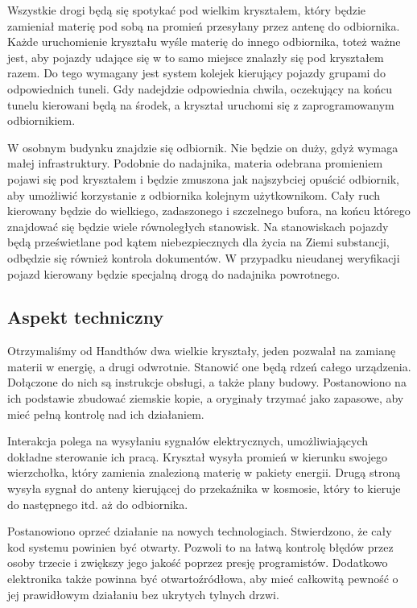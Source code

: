 Wszystkie drogi będą się spotykać pod wielkim kryształem, który będzie zamieniał materię pod sobą na promień przesyłany przez antenę do odbiornika.
Każde uruchomienie kryształu wyśle materię do innego odbiornika, toteż ważne jest, aby pojazdy udające się w to samo miejsce znalazły się pod kryształem razem.
Do tego wymagany jest system kolejek kierujący pojazdy grupami do odpowiednich tuneli.
Gdy nadejdzie odpowiednia chwila, oczekujący na końcu tunelu kierowani będą na środek, a kryształ uruchomi się z zaprogramowanym odbiornikiem.

W osobnym budynku znajdzie się odbiornik.
Nie będzie on duży, gdyż wymaga małej infrastruktury.
Podobnie do nadajnika, materia odebrana promieniem pojawi się pod kryształem i będzie zmuszona jak najszybciej opuścić odbiornik, aby umożliwić korzystanie z odbiornika kolejnym użytkownikom.
Cały ruch kierowany będzie do wielkiego, zadaszonego i szczelnego bufora, na końcu którego znajdować się będzie wiele równoległych stanowisk.
Na stanowiskach pojazdy będą prześwietlane pod kątem niebezpiecznych dla życia na Ziemi substancji, odbędzie się również kontrola dokumentów.
W przypadku nieudanej weryfikacji pojazd kierowany będzie specjalną drogą do nadajnika powrotnego.

\subsection{Aspekt techniczny}
Otrzymaliśmy od Handthów dwa wielkie kryształy, jeden pozwalał na zamianę materii w energię, a drugi odwrotnie. 
Stanowić one będą rdzeń całego urządzenia. 
Dołączone do nich są instrukcje obsługi, a także plany budowy.
Postanowiono na ich podstawie zbudować ziemskie kopie, a oryginały trzymać jako zapasowe, aby mieć pełną kontrolę nad ich działaniem.

Interakcja polega na wysyłaniu sygnałów elektrycznych, umożliwiających dokładne sterowanie ich pracą.
Kryształ wysyła promień w kierunku swojego wierzchołka, który zamienia znalezioną materię w pakiety energii.
Drugą stroną wysyła sygnał do anteny kierującej do przekaźnika w kosmosie, który to kieruje do następnego itd. aż do odbiornika.

Postanowiono oprzeć działanie na nowych technologiach.
Stwierdzono, że cały kod systemu powinien być otwarty.
Pozwoli to na łatwą kontrolę błędów przez osoby trzecie i zwiększy jego jakość poprzez presję programistów.
Dodatkowo elektronika także powinna być otwartoźródłowa, aby mieć całkowitą pewność o jej prawidłowym działaniu bez ukrytych tylnych drzwi.

